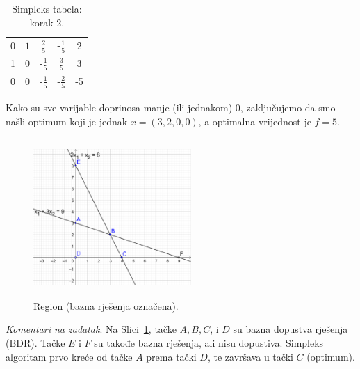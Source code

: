 \documentclass[a4paper, utf8, 11pt, colorlinks]{book}
\begin{document}
   \begin{table}[!ht]
     \centering
     \begin{tabular}{c c c c | c}
         0 &  $1$  & $\frac{2}{5}$             &  -$\frac{1}{5} $ & 2 \\
         1 &  0    &      -$\frac{1}{5}$    & $\frac{3}{5}$    & 3 \\ \hline
         0 &  0    &   -$\frac{1}{5}$       &   -$\frac{2}{5}$   & -5 \\ \hline
     \end{tabular}
     \caption{Simpleks tabela: korak 2.}
     \label{tab:simpleks_tabela3}
 \end{table}
 Kako su sve varijable doprinosa manje (ili jednakom) 0, zaključujemo da smo našli optimum koji je jednak $x = (3, 2, 0, 0)$, a optimalna vrijednost je $f = 5$.
 
 \begin{figure}[!ht]
     \centering
     \includegraphics[width=170pt, height=170pt]{simpleks-region-2.eps}
     \caption{Region (bazna rješenja označena).}
     \label{fig:simplex_region} 
 \end{figure}
 
 \emph{Komentari na zadatak}. Na Slici~\ref{fig:simplex_region}, tačke $A, B, C$, i $D$ su bazna dopustva rješenja (BDR). Tačke $E$ i $F$ su takođe bazna rješenja, ali nisu dopustiva. Simpleks algoritam prvo kreće od tačke $A$ prema tački $D$, te završava u tački $C$ (optimum).
 
\end{document}
